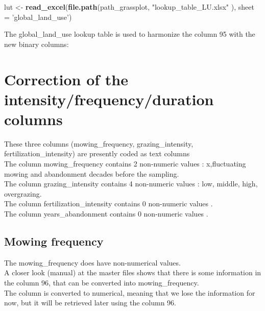 \documentclass[table]{article}
\newenvironment{Shaded}{\begin{snugshade}}{\end{snugshade}}
\newcommand{\KeywordTok}[1]{\textcolor[rgb]{0.13,0.29,0.53}{\textbf{#1}}}
\newcommand{\DataTypeTok}[1]{\textcolor[rgb]{0.13,0.29,0.53}{#1}}
\newcommand{\StringTok}[1]{\textcolor[rgb]{0.31,0.60,0.02}{#1}}
\newcommand{\OperatorTok}[1]{\textcolor[rgb]{0.81,0.36,0.00}{\textbf{#1}}}
\newcommand{\NormalTok}[1]{#1}
\begin{document}
\begin{Shaded}
\begin{Highlighting}[]
\NormalTok{lut <-}\StringTok{ }\KeywordTok{read_excel}\NormalTok{(}\KeywordTok{file.path}\NormalTok{(path_grassplot, }\StringTok{"lookup_table_LU.xlsx"}\NormalTok{ ),}
                 \DataTypeTok{sheet =} \StringTok{'global_land_use'}\NormalTok{)}
\end{Highlighting}
\end{Shaded}

The global\_land\_use lookup table is used to harmonize the column 95
with the new binary columns:

\begin{Shaded}
\end{Shaded}

\section{Correction of the intensity/frequency/duration
columns}\label{correction-of-the-intensityfrequencyduration-columns}

These three columns (mowing\_frequency, grazing\_intensity,
fertilization\_intensity) are presently coded as text columns\\
The column mowing\_frequency contains 2 non-numeric values :
x,fluctuating mowing and abandonment decades before the sampling.\\
The column grazing\_intensity contains 4 non-numeric values : low,
middle, high, overgrazing.\\
The column fertilization\_intensity contains 0 non-numeric values .\\
The column years\_abandonment contains 0 non-numeric values .

\subsection{Mowing frequency}\label{mowing-frequency}

The mowing\_frequency does have non-numerical values.\\
A closer look (manual) at the master files shows that there is some
information in the column 96, that can be converted into
mowing\_frequency.\\
The column is converted to numerical, meaning that we lose the
information for now, but it will be retrieved later using the column 96.
\end{document}
